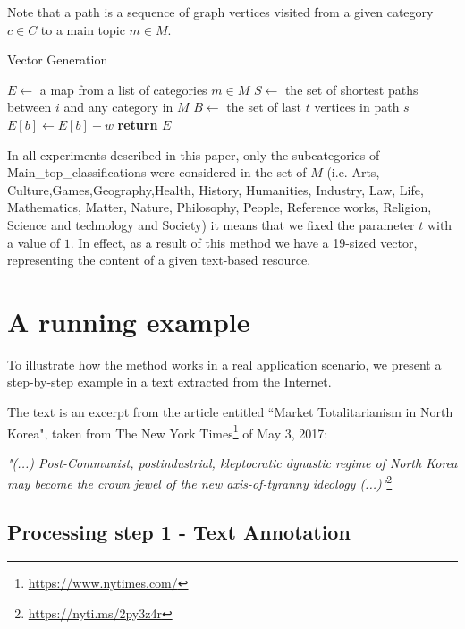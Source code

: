 Note that a path is a sequence of graph vertices visited from a given category $c \in C$ to a main topic $m \in M$.  

\begin{algorithm}
\caption{Vector Generation}\label{alg:fingerprint}
\label{alg:fingerprint-generation}
\begin{algorithmic}[1]
\State $E\gets$ a map from a list of categories $ m \in M$
\State $S\gets$ the set of shortest paths between $i$ and any category in $M$
\State $B\gets$ the set of last $t$ vertices in path $s$
\State $E[b]\gets E[b] + w$
\EndFor
\EndFor
\EndFor
\State \textbf{return} $E$
\EndProcedure
\end{algorithmic}
\end{algorithm}


In all experiments described in this paper, only the subcategories of Main\_top\_classifications were considered in the set of  $M$ (i.e. Arts, Culture,Games,Geography,Health, History, Humanities, Industry, Law, Life, Mathematics, Matter, Nature, Philosophy, People, Reference works, Religion, Science and technology and Society) it means that we fixed the parameter $t$ with a value of $1$. In effect, as a result of this method we have a 19-sized vector, representing the content of a given text-based resource.

\section{\hspace*{3pt} A running example}

To illustrate how the method works in a real application scenario, we present a step-by-step example in a text extracted from the Internet.

The text is an excerpt from the article entitled ``Market Totalitarianism in North Korea", taken from The New York Times\footnote{\url{https://www.nytimes.com/}} of May 3, 2017: \

\textit{"(...) Post-Communist, postindustrial, kleptocratic dynastic regime of North Korea may become the crown jewel of the new axis-of-tyranny ideology (...)"}\footnote{\url{https://nyti.ms/2py3z4r}} \

\subsection{\hspace*{3pt} Processing step 1 - Text Annotation} 

